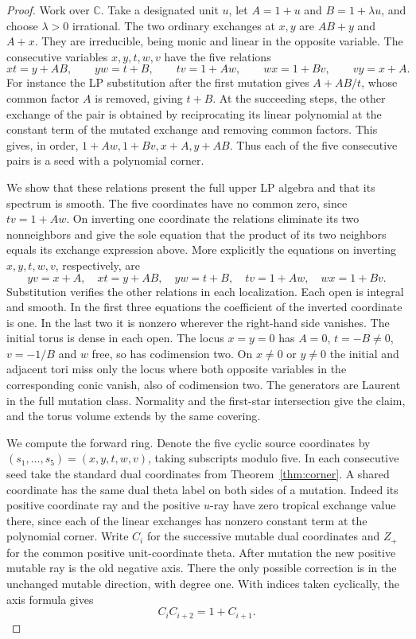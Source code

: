 \documentclass[11pt,reqno]{amsart}
\numberwithin{equation}{section}
\theoremstyle{definition}
\theoremstyle{remark}
\begin{document}
\begin{proof}
Work over \(\mathbb C\). Take a designated unit \(u\), let
\(A=1+u\) and \(B=1+\lambda u\), and choose \(\lambda>0\)
irrational. The two ordinary exchanges at \(x,y\) are
\(AB+y\) and \(A+x\). They are irreducible, being monic and
linear in the opposite variable. The consecutive variables
\(x,y,t,w,v\) have the five relations
\begin{equation}\label{eq:five-source-exchanges}
xt=y+AB,\qquad yw=t+B,\qquad tv=1+Aw,\qquad wx=1+Bv,\qquad vy=x+A .
\end{equation}
For instance the LP substitution after the first mutation gives
\(A+AB/t\), whose common factor \(A\) is removed, giving \(t+B\).
At the succeeding steps, the other exchange of the pair is obtained
by reciprocating its linear polynomial at the constant term of the
mutated exchange and removing common factors. This gives, in order,
\(1+Aw,1+Bv,x+A,y+AB\). Thus each of the five consecutive pairs is a seed with a polynomial corner.

We show that these relations present the full upper LP algebra and that
its spectrum is smooth.
The five coordinates have no common zero, since \(tv=1+Aw\). On inverting one coordinate
the relations eliminate its two nonneighbors and give the sole equation
that the product of its two neighbors equals its exchange expression
above. More explicitly the equations on inverting \(x,y,t,w,v\),
respectively, are
\[ yv=x+A,\quad xt=y+AB,\quad yw=t+B,\quad tv=1+Aw,\quad wx=1+Bv . \]
Substitution verifies the other relations in each localization.
Each open is integral and smooth. In the first three equations the
coefficient of the inverted coordinate is one. In the last two it is
nonzero wherever the right-hand side vanishes. The initial torus is
dense in each open. The locus \(x=y=0\) has \(A=0\), \(t=-B\ne0\),
\(v=-1/B\) and \(w\) free, so has codimension two. On \(x\ne0\)
or \(y\ne0\) the initial and adjacent tori miss only the locus
where both opposite variables in the corresponding conic vanish,
also of codimension two. The generators are Laurent in the full
mutation class. Normality and the first-star intersection give the
claim, and the torus volume extends by the same covering.

We compute the forward ring. Denote the five cyclic source
coordinates by \((s_1,\ldots,s_5)=(x,y,t,w,v)\), taking subscripts modulo five.
In each consecutive seed take the standard dual coordinates
from Theorem~\ref{thm:corner}. A shared coordinate has the same
dual theta label on both sides of a mutation. Indeed its positive
coordinate ray and the positive \(u\)-ray have zero tropical
exchange value there, since each of the linear exchanges has
nonzero constant term at the polynomial corner. Write \(C_i\)
for the successive mutable dual coordinates and \(Z_+\) for the
common positive unit-coordinate theta. After mutation the new
positive mutable ray is the old negative axis. There the only
possible correction is in the unchanged mutable direction, with
degree one. With indices taken cyclically, the axis formula gives
\begin{equation}\label{eq:five-mirror-exchanges}
C_i C_{i+2}=1+C_{i+1}.
\end{equation}


\end{proof}
\end{document}
